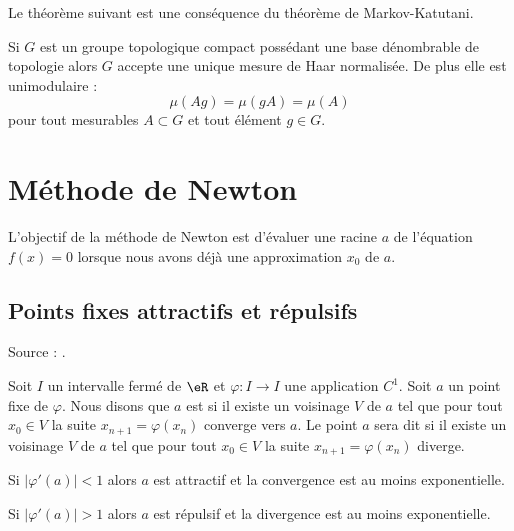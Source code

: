 Le théorème suivant est une conséquence du théorème de Markov-Katutani.
\begin{theorem}
    Si \( G\) est un groupe topologique compact possédant une base dénombrable de topologie alors \( G\) accepte une unique mesure de Haar normalisée. De plus elle est unimodulaire :
    \begin{equation}
        \mu(Ag)=\mu(gA)=\mu(A)
    \end{equation}
    pour tout mesurables \( A\subset G\) et tout élément \( g\in G\).
\end{theorem}

\section{Méthode de Newton}

L'objectif de la méthode de Newton est d'évaluer une racine \( a\) de l'équation \( f(x)=0\) lorsque nous avons déjà une approximation \( x_0\) de \( a\).

\subsection{Points fixes attractifs et répulsifs}

Source : \cite{DemaillyNum}.

Soit \( I\) un intervalle fermé de \( \eR\) et \( \varphi\colon I\to I\) une application \( C^1\). Soit \( a\) un point fixe de \( \varphi\). Nous disons que \( a\) est  si il existe un voisinage \( V\) de \( a\) tel que pour tout \( x_0\in V\) la suite \( x_{n+1}=\varphi(x_n)\) converge vers \( a\). Le point \( a\) sera dit  si il existe un voisinage \( V\) de \( a\) tel que pour tout \( x_0\in V\) la suite \( x_{n+1}=\varphi(x_n)\) diverge.

\begin{lemma}
    Si \( | \varphi'(a) |<1\) alors \( a\) est attractif et la convergence est au moins exponentielle.

    Si \( | \varphi'(a) |>1\) alors \( a\) est répulsif et la divergence est au moins exponentielle.
\end{lemma}

